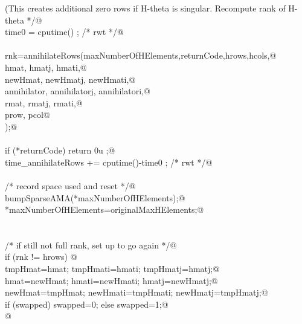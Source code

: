 \documentclass[12pt]{article}
\begin{document}
\begin{flushleft}
\begin{minipage}{\linewidth}
\begin{list}{}{}
\mbox{}\verb@                (This creates additional zero rows if H-theta is singular.  Recompute rank of H-theta */@\\
\mbox{}\verb@                time0 = cputime() ; /* rwt */@\\
\mbox{}\verb@@\\
\mbox{}\verb@                rnk=annihilateRows(maxNumberOfHElements,returnCode,hrows,hcols,@\\
\mbox{}\verb@                        hmat, hmatj, hmati,@\\
\mbox{}\verb@                        newHmat, newHmatj, newHmati,@\\
\mbox{}\verb@                        annihilator, annihilatorj, annihilatori,@\\
\mbox{}\verb@                        rmat, rmatj, rmati,@\\
\mbox{}\verb@                        prow, pcol@\\
\mbox{}\verb@                );@\\
\mbox{}\verb@@\\
\mbox{}\verb@                if (*returnCode) return 0u ;@\\
\mbox{}\verb@                time_annihilateRows += cputime()-time0 ; /* rwt */@\\
\mbox{}\verb@@\\
\mbox{}\verb@                /* record space used and reset */@\\
\mbox{}\verb@                bumpSparseAMA(*maxNumberOfHElements);@\\
\mbox{}\verb@                *maxNumberOfHElements=originalMaxHElements;@\\
\mbox{}\verb@@\\
\mbox{}\verb@@\\
\mbox{}\verb@                /* if still not full rank, set up to go again */@\\
\mbox{}\verb@                if (rnk != hrows) {@\\
\mbox{}\verb@                        tmpHmat=hmat; tmpHmati=hmati; tmpHmatj=hmatj;@\\
\mbox{}\verb@                        hmat=newHmat; hmati=newHmati; hmatj=newHmatj;@\\
\mbox{}\verb@                        newHmat=tmpHmat; newHmati=tmpHmati; newHmatj=tmpHmatj;@\\
\mbox{}\verb@                        if (swapped) {swapped=0;} else {swapped=1;}@\\
\mbox{}\verb@                }@\\

\end{list}
\end{minipage}
\end{flushleft}
\end{document}
